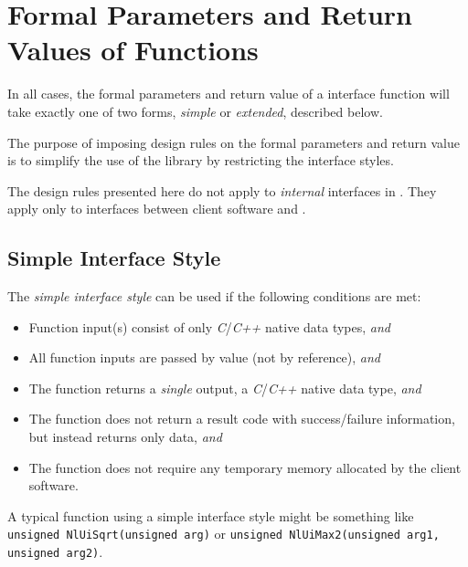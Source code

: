 \section{Formal Parameters and Return Values of Functions}
\label{cldd0:sfcp0}

In all cases, the formal parameters and return value of a 
\emph{\productbasenameshort{}} interface function will take 
exactly one of two forms, \emph{simple} or \emph{extended}, 
described below.  

The purpose of imposing design rules on the formal 
parameters and return value is to simplify the use of the 
library by restricting the \emph{\productbasenameshort{}} 
interface styles.  

The design rules presented here do not apply to 
\emph{internal} interfaces in 
\emph{\productbasenameshort{}}\@.  They apply only to 
interfaces between client software and 
\emph{\productbasenameshort{}}.  


\subsection{Simple Interface Style}
\label{cldd0:sfcp0:sifs0}

The \emph{simple interface style} can be used if the 
following conditions are met: 

\begin{itemize}
\item Function input(s) consist of only \emph{C}/\emph{C++}
      native data types, \emph{and}
\item All function inputs are passed by value (not by
      reference), \emph{and}
\item The function returns a \emph{single} output, 
      a \emph{C}/\emph{C++}
      native data type, \emph{and}
\item The function does not return a result code with
      success/failure
      information, but instead returns only data, \emph{and}
\item The function does not require any temporary memory
      allocated by the client software.
\end{itemize}

A typical function using a simple interface style might be 
something like \texttt{unsigned NlUiSqrt(unsigned arg)} or 
\texttt{unsigned NlUiMax2(unsigned arg1, unsigned arg2)}.  


